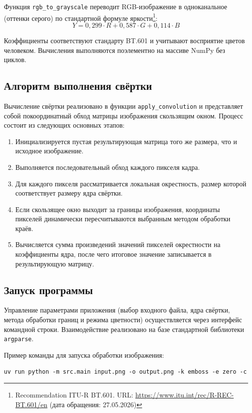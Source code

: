 \documentclass[a4paper]{article}
\begin{document}
Функция \verb|rgb_to_grayscale| переводит RGB-изображение в одноканальное (оттенки серого) по стандартной формуле яркости\footnote{Recommendation ITU-R BT.601. URL: \url{https://www.itu.int/rec/R-REC-BT.601/en} (дата обращения: 27.05.2026)}:
\[
Y = 0{,}299 \cdot R + 0{,}587 \cdot G + 0{,}114 \cdot B
\]

Коэффициенты соответствуют стандарту BT.601 и учитывают восприятие цветов человеком. Вычисления выполняются поэлементно на массиве NumPy без циклов.

\subsection{Алгоритм выполнения свёртки}

Вычисление свёртки реализовано в функции \texttt{apply\_convolution} и представляет собой покоординатный обход матрицы изображения скользящим окном. Процесс состоит из следующих основных этапов:

\begin{enumerate}
    \item Инициализируется пустая результирующая матрица того же размера, что и исходное изображение.
    \item Выполняется последовательный обход каждого пикселя кадра.
    \item Для каждого пикселя рассматривается локальная окрестность, размер которой соответствует размеру ядра свёртки.
    \item Если скользящее окно выходит за границы изображения, координаты пикселей динамически пересчитываются выбранным методом обработки краёв.
    \item Вычисляется сумма произведений значений пикселей окрестности на коэффициенты ядра, после чего итоговое значение записывается в результирующую матрицу.
\end{enumerate}

\subsection{Запуск программы}

Управление параметрами приложения (выбор входного файла, ядра свёртки, метода обработки границ и режима цветности) осуществляется через интерфейс командной строки. Взаимодействие реализовано на базе стандартной библиотеки \texttt{argparse}.

Пример команды для запуска обработки изображения:
\begin{verbatim}
uv run python -m src.main input.png -o output.png -k emboss -e zero -c
\end{verbatim}
\end{document}
